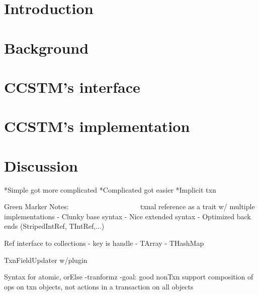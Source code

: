 \documentclass[preprint]{sigplanconf}
\newcommand{\codesec}[1]{{\fontsize{10}{12}\selectfont \tt \bfseries #1}}
\newcommand{\typesec}[1]{{\codesec{\itshape #1}}}
\newcommand{\typeparamsec}[1]{{\codesec{\bfseries #1}}}
\newcommand{\xtypesec}[2]{{\typesec{#1}\typeparamsec{[#2]}}}
\begin{document}

\terms
\xterms

\keywords
\xkeywords

\section{Introduction}
\label{sec:intro}


\section{Background}
\label{sec:library}


\section{CCSTM's interface}
\label{sec:ref}


\section{CCSTM's implementation}
\label{sec:impl}


\section{Discussion}
\label{sec:discussion}

*Simple got more complicated
*Complicated got easier
*Implicit txn


Green Marker Notes:
~~~~~~~~~~~~~~~~~~~
txnal reference as a trait
    w/ multiple implementations
  - Clunky base syntax
  - Nice extended syntax
  - Optimized back ends (StripedIntRef, TIntRef,...)

Ref interface to collections
  - key is handle
  - TArray
  - THashMap

TxnFieldUpdater w/plugin

Syntax for atomic, orElse
  -tranformz
  -goal: good nonTxn support
        composition of ops on txn objects, 
        not actions in a transaction on all objects
\end{document}
